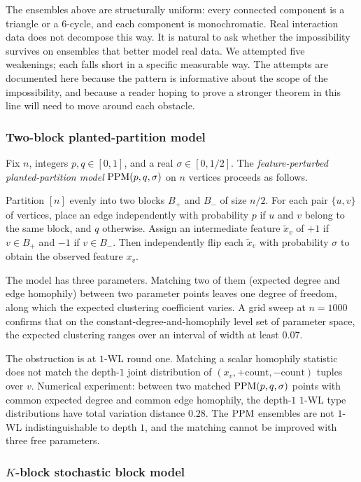 The ensembles above are structurally uniform: every connected
component is a triangle or a $6$-cycle, and each component is
monochromatic. Real interaction data does not decompose this way. It
is natural to ask whether the impossibility survives on ensembles
that better model real data. We attempted five weakenings; each falls
short in a specific measurable way. The attempts are documented here
because the pattern is informative about the scope of the
impossibility, and because a reader hoping to prove a stronger
theorem in this line will need to move around each obstacle.

\subsubsection*{Two-block planted-partition model}

Fix $n$, integers $p, q \in [0, 1]$, and a real $\sigma \in [0, 1/2]$.
The \emph{feature-perturbed planted-partition model} $\mathrm{PPM}(p, q,
\sigma)$ on $n$ vertices proceeds as follows.

Partition $[n]$ evenly into two blocks $B_+$ and $B_-$ of size
$n/2$. For each pair $\{u, v\}$ of vertices, place an edge
independently with probability $p$ if $u$ and $v$ belong to the same
block, and $q$ otherwise. Assign an intermediate feature $\tilde x_v$
of $+1$ if $v \in B_+$ and $-1$ if $v \in B_-$. Then independently
flip each $\tilde x_v$ with probability $\sigma$ to obtain the
observed feature $x_v$.

The model has three parameters. Matching two of them (expected degree
and edge homophily) between two parameter points leaves one degree of
freedom, along which the expected clustering coefficient varies. A
grid sweep at $n = 1000$ confirms that on the constant-degree-and-homophily
level set of parameter space, the expected clustering ranges over an
interval of width at least $0.07$.

The obstruction is at $1$-WL round one. Matching a scalar homophily
statistic does not match the depth-$1$ joint distribution of $(x_v,
+\text{count}, -\text{count})$ tuples over $v$. Numerical experiment:
between two matched $\mathrm{PPM}(p, q, \sigma)$ points with common expected
degree and common edge homophily, the depth-$1$ $1$-WL type
distributions have total variation distance $0.28$. The $\mathrm{PPM}$
ensembles are not $1$-WL indistinguishable to depth $1$, and the
matching cannot be improved with three free parameters.

\subsubsection*{$K$-block stochastic block model}


